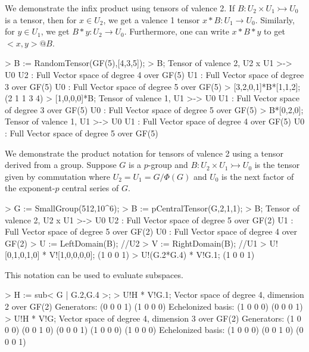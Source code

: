 \begin{example}
We demonstrate the infix product using tensors of valence 2. 
If $B : U_2\times U_1\rightarrowtail U_0$ is a tensor, then for $x\in U_2$, we get a valence 1 tensor $x*B : U_1\rightarrow U_0$.
Similarly, for $y\in U_1$, we get $B*y : U_2\rightarrow U_0$. Furthermore, one can write $x*B*y$ to get $<x,y> @B$.

\begin{code}
> B := RandomTensor(GF(5),[4,3,5]);
> B;
Tensor of valence 2, U2 x U1 >-> U0
U2 : Full Vector space of degree 4 over GF(5)
U1 : Full Vector space of degree 3 over GF(5)
U0 : Full Vector space of degree 5 over GF(5)
> [3,2,0,1]*B*[1,1,2];
(2 1 1 3 4)
> [1,0,0,0]*B;
Tensor of valence 1, U1 >-> U0
U1 : Full Vector space of degree 3 over GF(5)
U0 : Full Vector space of degree 5 over GF(5)
> B*[0,2,0];
Tensor of valence 1, U1 >-> U0
U1 : Full Vector space of degree 4 over GF(5)
U0 : Full Vector space of degree 5 over GF(5)
\end{code}
\end{example}

\begin{example}
We demonstrate the product notation for tensors of valence 2 using a tensor derived from a group. 
Suppose $G$ is a $p$-group and $B : U_2\times U_1\rightarrowtail U_0$ is the tensor given by commutation where $U_2=U_1=G/\Phi(G)$ and $U_0$ is the next factor of the exponent-$p$ central series of $G$.

\begin{code}
> G := SmallGroup(512,10^6);
> B := pCentralTensor(G,2,1,1);
> B;
Tensor of valence 2, U2 x U1 >-> U0
U2 : Full Vector space of degree 5 over GF(2)
U1 : Full Vector space of degree 5 over GF(2)
U0 : Full Vector space of degree 4 over GF(2)
> U := LeftDomain(B);   //U2
> V := RightDomain(B);  //U1
> U![0,1,0,1,0] * V![1,0,0,0,0];
(1 0 0 1)
> U!(G.2*G.4) * V!G.1;
(1 0 0 1)
\end{code}

This notation can be used to evaluate subspaces.

\begin{code}
> H := sub< G | G.2,G.4 >;
> U!H * V!G.1;
Vector space of degree 4, dimension 2 over GF(2)
Generators:
(0 0 0 1)
(1 0 0 0)
Echelonized basis:
(1 0 0 0)
(0 0 0 1)
> U!H * V!G;
Vector space of degree 4, dimension 3 over GF(2)
Generators:
(1 0 0 0)
(0 0 1 0)
(0 0 0 1)
(1 0 0 0)
(1 0 0 0)
Echelonized basis:
(1 0 0 0)
(0 0 1 0)
(0 0 0 1)
\end{code}
\end{example}

